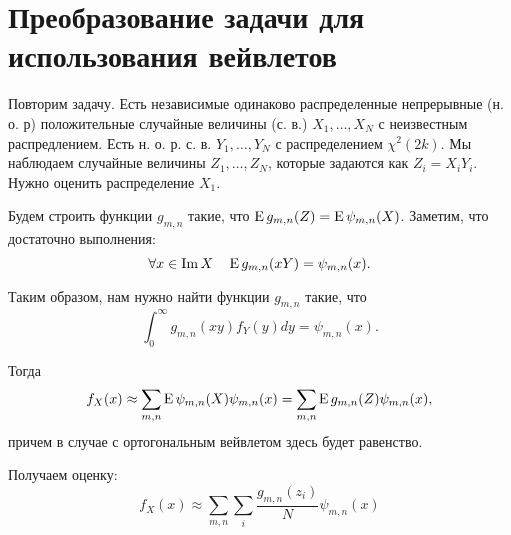 \documentclass[../paper.tex]{subfiles}
\begin{document}
\section{Преобразование задачи для использования вейвлетов}
Повторим задачу.
Есть независимые одинаково распределенные непрерывные (н. о. р) положительные случайные величины (с. в.) $X_1, \dots, X_N$ с неизвестным распредлением.
Есть н. о. р. с. в. $Y_1, \dots, Y_N$ с распределением $\chi^2(2k)$.
Мы наблюдаем случайные величины $Z_1, \dots, Z_N$, которые задаются как $Z_i = X_i Y_i$.
Нужно оценить распределение $X_1$.

Будем строить функции $g_{m,n}$ такие, что $\operatorname{E} g_{m,n}(Z) = \operatorname{E} \psi_{m,n}(X)$. Заметим, что достаточно выполнения:
\[
    \forall x \in \operatorname{Im} X \quad \operatorname{E} g_{m,n} (xY) = \psi_{m,n}(x) 
.\]

Таким образом, нам нужно найти функции $g_{m,n}$ такие, что
\[\label{eq:int-eq}
	\int_0^\infty g_{m,n}(xy) f_Y(y) dy = \psi_{m,n}(x)
.\]

Тогда
\[
	f_X(x) 
	\approx \sum_{m,n} \operatorname{E} \psi_{m,n}(X)\psi_{m,n}(x)
	= \sum_{m,n} \operatorname{E} g_{m,n}(Z) \psi_{m,n}(x)
,\] причем в случае с ортогональным вейвлетом здесь будет равенство.

Получаем оценку:
\[
	f_X(x) 
	\approx \sum_{m,n} \sum_i \frac{g_{m,n}(z_i)}{N} \psi_{m,n}(x)
\]
\end{document}
